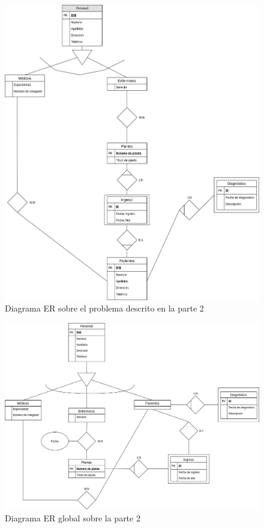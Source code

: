 \documentclass{article}
\begin{document}


\begin{figure}
\centering
\includegraphics[scale=0.5]{images/er_parte2_2.png}
\caption{Diagrama ER sobre el problema descrito en la parte 2}
\label{fig:er_parte2_2}
\end{figure}



\begin{landscape}
\begin{figure}
\centering
\includegraphics[scale=0.45]{images/global_parte2_practica3.png}
\caption{Diagrama ER global sobre la parte 2}
\label{fig:er_parte2_global}
\end{figure}
\end{landscape}
\end{document}
